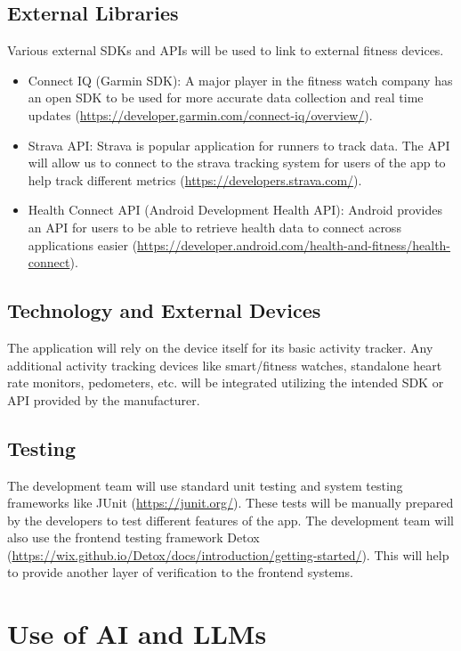 \documentclass{article}
\begin{document}
\subsection{External Libraries}
Various external SDKs and APIs will be used to link to external fitness devices.
\begin{itemize}
    \item Connect IQ (Garmin SDK): A major player in the fitness watch company has an open SDK to be used for more accurate data collection and real time updates (\url{https://developer.garmin.com/connect-iq/overview/}).
    \item Strava API: Strava is popular application for runners to track data. The API will allow us to connect to the strava tracking system for users of the app to help track different metrics (\url{https://developers.strava.com/}).
    \item Health Connect API (Android Development Health API): Android provides an API for users to be able to retrieve health data to connect across applications easier (\url{https://developer.android.com/health-and-fitness/health-connect}).
\end{itemize}

\subsection{Technology and External Devices}
The application will rely on the device itself for its basic activity tracker. 
Any additional activity tracking devices like smart/fitness watches, standalone heart rate monitors, pedometers, etc. will be integrated utilizing the intended SDK or API provided by the manufacturer. 

\subsection{Testing}
The development team will use standard unit testing and system testing frameworks like JUnit (\url{https://junit.org/}). 
These tests will be manually prepared by the developers to test different features of the app. 
The development team will also use the frontend testing framework Detox (\url{https://wix.github.io/Detox/docs/introduction/getting-started/}). This will help to provide another layer of verification to the frontend systems.

\section{Use of AI and LLMs}
\end{document}
